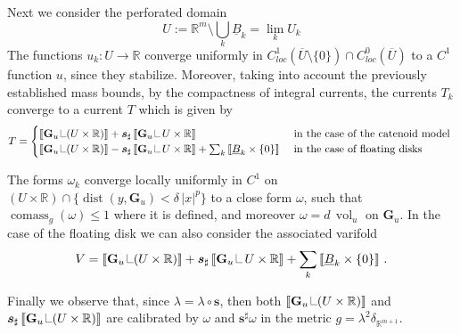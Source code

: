 \documentclass[reqno]{amsart}
\theoremstyle{definition}
\theoremstyle{remark}
\numberwithin{equation}{section}
\newcommand{\R}{\mathbb{R}}
\DeclareMathOperator{\dist}{dist}
\newcommand\res{\mathop{\hbox{\vrule height 7pt width .3pt depth 0pt\vrule height .3pt width 5pt depth 0pt}}\nolimits}
\newcommand{\bC}{\mathbf{C}} %
\newcommand{\bG}{\mathbf{G}} %
\def\a#1{\left\llbracket{#1}\right\rrbracket}
\begin{document}
Next we consider the perforated domain 
\[U:=\R^m\setminus \bigcup_k\underline{B}_k=\lim_k U_k\]
The functions $u_k\colon U \to \R$ converge uniformly in $C^1_{loc}(\overline{U}\setminus \{0\})\cap C^0_{loc}(\overline{U})$ to a $C^1$ function $u$, since they stabilize. Moreover, taking into account the previously established mass bounds, by the compactness of integral currents,  the currents $T_k$ converge to a current  $T$ which is given by 
\[ T=\begin{cases}\a{\bG_{u}\res (U\times \R)} + \boldsymbol{s}_\sharp\a{\bG_{u}\res U\times \R} &\text{ in the case of the catenoid model }\\
    \a{\bG_{u}\res (U\times \R)}  - \boldsymbol{s}_\sharp\a{\bG_{u}\res U\times \R} + \sum_{k} \a{\underline{B}_k\times \{0\}} &\text{ in the case of floating disks}\end{cases}\]

The forms $\omega_k$ converge locally uniformly in $C^1$ on $(U\times \R)\cap \{\dist(y,\bG_{u})<\delta\,|x|^p\}$ to a close form $\omega$, such that $\operatorname{comass}_g(\omega)\leq 1$ where it is defined, and moreover $\omega=d\,\operatorname{vol}_u$ on $\bG_u$.
In the case of the floating disk we can also consider the associated varifold 
\[
V= \a{\bG_{u}\res (U\times \R)} + \boldsymbol{s}_\sharp\a{\bG_{u}\res U\times \R} +  \sum_k \a{\underline{B}_k\times \{0\}}\,.
\]

Finally we observe that, since $\lambda=\lambda \circ \boldsymbol{s}$, then both $\a{\bG_u\res(U\times \R)}$ and $\boldsymbol{s}_\sharp\a{\bG_u\res(U\times \R)}$ are calibrated by $\omega$ and $\boldsymbol{s}^\sharp\omega$ in the metric $g=\lambda^2 \delta_{\R^{m+1}}$.

 




\end{document}
